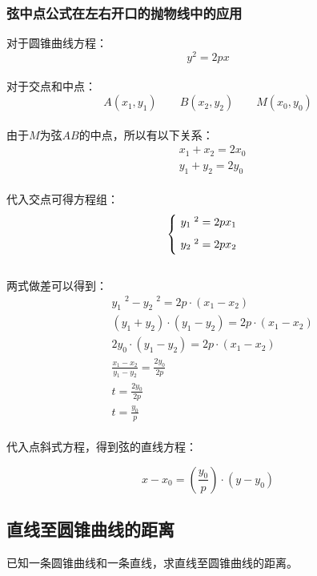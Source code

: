 \documentclass[UTF8]{ctexart}
\begin{document}
\subsubsection{弦中点公式在左右开口的抛物线中的应用}
    对于圆锥曲线方程：
    \setcounter{equation}{0}
    \begin{equation}
        y^2=2px
    \end{equation}\\
    对于交点和中点：
    \begin{equation}
        A(x_1,y_1)\qquad B(x_2,y_2)\qquad M(x_0,y_0)
    \end{equation}\\
    由于$M$为弦$AB$的中点，所以有以下关系：
    \begin{align}
        &x_1+x_2=2x_0\\[2mm]
        &y_1+y_2=2y_0
    \end{align}\\
    代入交点可得方程组：
    \begin{equation}
        \begin{cases}
            \ y_1\;^2=2px_1\\[2mm]
            \ y_2\;^2=2px_2\vspace{2pt}
        \end{cases}
    \end{equation}\\[1mm]
    两式做差可以得到：
    \begin{align}
        &y_1\;^2-y_2\;^2=2p\cdot(x_1-x_2)\\[3mm]
        &(y_1+y_2)\cdot(y_1-y_2)=2p\cdot(x_1-x_2)\\[3mm]
        &2y_0\cdot(y_1-y_2)=2p\cdot(x_1-x_2)\\[3mm]
        &\frac{x_1-x_2}{y_1-y_2}=\frac{2y_0}{2p}\\[3mm]
        &t=\frac{2y_0}{2p}\\[3mm]
        &t=\frac{y_0}{p}
    \end{align}\\
    代入点斜式方程，得到弦的直线方程：
    \begin{large}
        \begin{equation*}
            x-x_0=\left(\frac{y_0}{p}\right)\cdot(y-y_0)
        \end{equation*}
    \end{large}

\newpage

\subsection{直线至圆锥曲线的距离}
    已知一条圆锥曲线和一条直线，求直线至圆锥曲线的距离。
\end{document}

